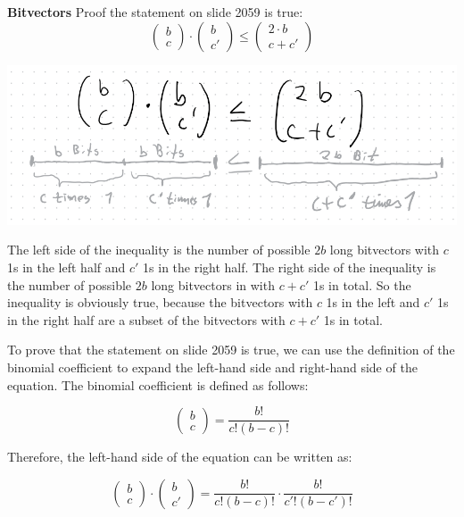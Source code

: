 \question \textbf{Bitvectors}
Proof the statement on slide 2059 is true:
\begin{equation}
\begin{pmatrix}
b\\c
\end{pmatrix}
\cdot
\begin{pmatrix}
b\\c'
\end{pmatrix}
\leq
\begin{pmatrix}
2\cdot b\\c + c'
\end{pmatrix}
\end{equation}



\begin{solution}

\includegraphics[width=0.5\linewidth]{task_3/a3.png}

The left side of the inequality is the number of possible $2b$ long bitvectors with $c$ 1s in the left half and $c'$ 1s in the right half. The right side of the inequality is the number of possible $2b$ long bitvectors in with $c+c'$ 1s in total. So the inequality is obviously true, because the bitvectors with $c$ 1s in the left and $c'$ 1s in the right half are a subset of the bitvectors with $c+c'$ 1s in total.

To prove that the statement on slide 2059 is true, we can use the definition of the binomial coefficient to expand the left-hand side and right-hand side of the equation. The binomial coefficient is defined as follows:

\begin{equation}
\begin{pmatrix}
b\\c
\end{pmatrix}
= \frac{b!}{c!(b - c)!}
\end{equation}

Therefore, the left-hand side of the equation can be written as:

\begin{equation}
\begin{pmatrix}
b\\c
\end{pmatrix}
\cdot
\begin{pmatrix}
b\\c'
\end{pmatrix}
= \frac{b!}{c!(b - c)!} \cdot \frac{b!}{c'!(b - c')!}
\end{equation}


\end{solution}
